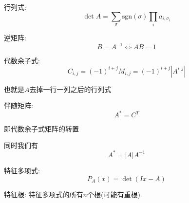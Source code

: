 行列式: $$\det A = \sum_{\sigma} \text{sgn}(\sigma) \prod_{i}a_{i, \sigma_i}$$

逆矩阵: $$B = A^{-1} \iff AB = 1$$

代数余子式: $$C_{i, j} = (-1)^{i + j} M_{i, j} = (-1) ^ {i + j} \left| A ^ {i, j} \right|$$

也就是$A$去掉一行一列之后的行列式

伴随矩阵: $$A^{*} = C^T$$

即代数余子式矩阵的转置

同时我们有 $$ A^{*} = |A| A^{-1}$$

特征多项式: $$P_A(x) = \det{(Ix - A)}$$

特征根: 特征多项式的所有$n$个根(可能有重根).